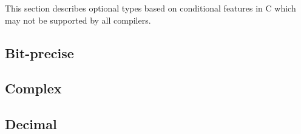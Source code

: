 \def\Subsection#1{\subsection{#1}}

This section describes optional types based on conditional
features in C which may not be supported by all compilers.

\Subsection{Bit-precise}

\Subsection{Complex}

\Subsection{Decimal}
